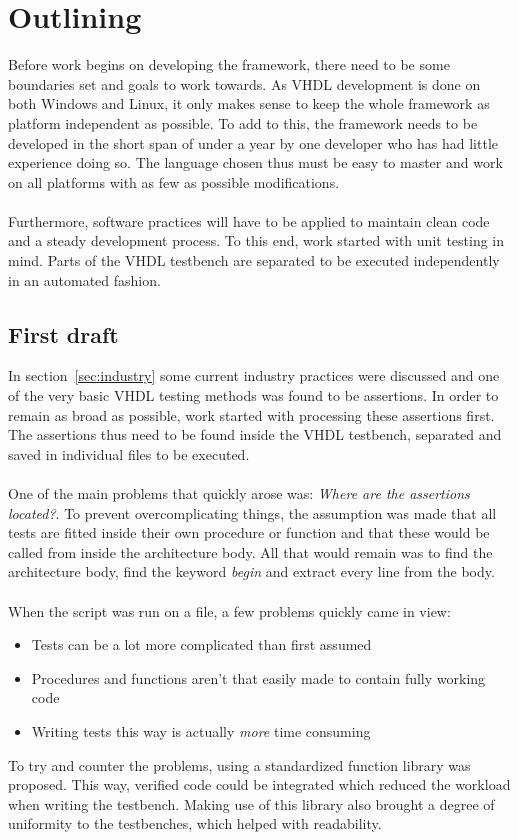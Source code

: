 \documentclass[11pt,british]{article}
\begin{document}
\section{Outlining}
\label{sec:outlining}
Before work begins on developing the framework, there need to be some boundaries set and goals to work towards. As VHDL development is done on both Windows and Linux, it only makes sense to keep the whole framework as platform independent as possible. To add to this, the framework needs to be developed in the short span of under a year by one developer who has had little experience doing so. The language chosen thus must be easy to master and work on all platforms with as few as possible modifications.\\
\\
Furthermore, software practices will have to be applied to maintain clean code and a steady development process. To this end, work started with unit testing in mind. Parts of the VHDL testbench are separated to be executed independently in an automated fashion.

\subsection{First draft}
\label{subsec:first}
In section~\ref{sec:industry} some current industry practices were discussed and one of the very basic VHDL testing methods was found to be assertions. In order to remain as broad as possible, work started with processing these assertions first. The assertions thus need to be found inside the VHDL testbench, separated and saved in individual files to be executed.\\
\\
One of the main problems that quickly arose was: \emph{Where are the assertions located?}. To prevent overcomplicating things, the assumption was made that all tests are fitted inside their own procedure or function and that these would be called from inside the architecture body. All that would remain was to find the architecture body, find the keyword \emph{begin} and extract every line from the body.\\
\\
When the script was run on a file, a few problems quickly came in view:
\begin{itemize}
\item Tests can be a lot more complicated than first assumed
\item Procedures and functions aren't that easily made to contain fully working code
\item Writing tests this way is actually \emph{more} time consuming
\end{itemize}
To try and counter the problems, using a standardized function library was proposed. This way, verified code could be integrated which reduced the workload when writing the testbench. Making use of this library also brought a degree of uniformity to the testbenches, which helped with readability.
\end{document}
